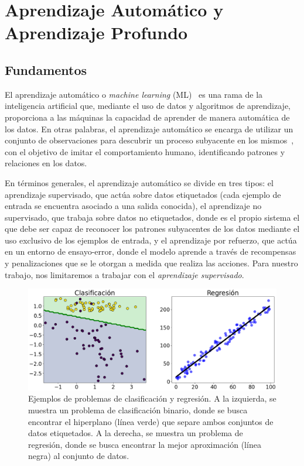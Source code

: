 
\chapter{Aprendizaje Automático y Aprendizaje Profundo}\label{ch:capitulo-aprendizaje-automatico-y-profundo}

\section{Fundamentos}\label{sec:fundamentos-aprendizaje-automatico-y-aprendizaje-profundo}
El aprendizaje automático o \emph{machine learning} (ML)~\cite{Bishop2006, Murphy2022, Murphy2023} es una rama de la inteligencia artificial que, mediante el uso de datos y algoritmos de aprendizaje, proporciona a las máquinas la capacidad de aprender de manera automática de los datos. En otras palabras, el aprendizaje automático se encarga de utilizar un conjunto de observaciones para descubrir un proceso subyacente en los mismos~\cite{Mostafa2012}, con el objetivo de imitar el comportamiento humano, identificando patrones y relaciones en los datos.

En términos generales, el aprendizaje automático se divide en tres tipos: el aprendizaje supervisado, que actúa sobre datos etiquetados (cada ejemplo de entrada se encuentra asociado a una salida conocida), el aprendizaje no supervisado, que trabaja sobre datos no etiquetados, donde es el propio sistema el que debe ser capaz de reconocer los patrones subyacentes de los datos mediante el uso exclusivo de los ejemplos de entrada, y el aprendizaje por refuerzo, que actúa en un entorno de ensayo-error, donde el modelo aprende a través de recompensas y penalizaciones que se le otorgan a medida que realiza las acciones. Para nuestro trabajo, nos limitaremos a trabajar con el \emph{aprendizaje supervisado}.

\begin{figure}[h]
    \centering
    \includegraphics[width=0.8\linewidth]{img/clasi-regresion.png}
    \caption[Ejemplos de problemas de clasificación y regresión.]{Ejemplos de problemas de clasificación y regresión. A la izquierda, se muestra un problema de clasificación binario, donde se busca encontrar el hiperplano (línea verde) que separe ambos conjuntos de datos etiquetados. A la derecha, se muestra un problema de regresión, donde se busca encontrar la mejor aproximación (línea negra) al conjunto de datos.}\label{fig:clasi-regresion}
\end{figure}

